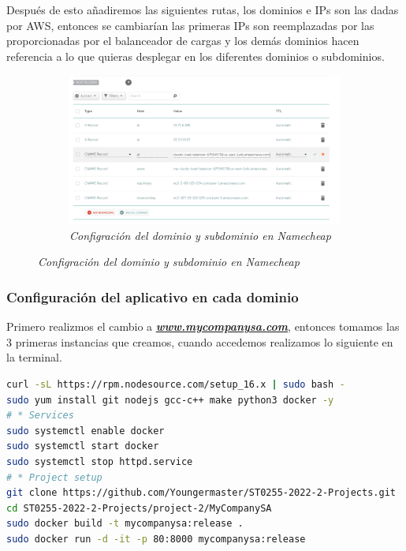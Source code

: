 Después de esto añadiremos las siguientes rutas, los dominios e IPs son las
dadas por AWS, entonces se cambiarían las primeras IPs son reemplazadas por las
proporcionadas por el balanceador de cargas y los demás dominios hacen
referencia a lo que quieras desplegar en los diferentes dominios o subdominios.

\begin{figure}[H]
    \centering
    \begin{subfigure}[b]{0.8\textwidth}
        \centering
        \includegraphics[width=\textwidth]{Figures/0. General/domain_config.png}
        \caption{\textit{Configración del dominio y subdominio en Namecheap}}
        \label{fig: domain configuration}
    \end{subfigure}
\end{figure}

\subsubsection{Configuración del aplicativo en cada dominio}

Primero realizmos el cambio a \textbf{\textit{\url{www.mycompanysa.com}}},
entonces tomamos las 3 primeras instancias que creamos, cuando accedemos
realizamos lo siguiente en la terminal.

\begin{lstlisting}[language=Bash]
curl -sL https://rpm.nodesource.com/setup_16.x | sudo bash -
sudo yum install git nodejs gcc-c++ make python3 docker -y
# * Services
sudo systemctl enable docker
sudo systemctl start docker
sudo systemctl stop httpd.service
# * Project setup
git clone https://github.com/Youngermaster/ST0255-2022-2-Projects.git
cd ST0255-2022-2-Projects/project-2/MyCompanySA
sudo docker build -t mycompanysa:release .
sudo docker run -d -it -p 80:8000 mycompanysa:release
\end{lstlisting}

